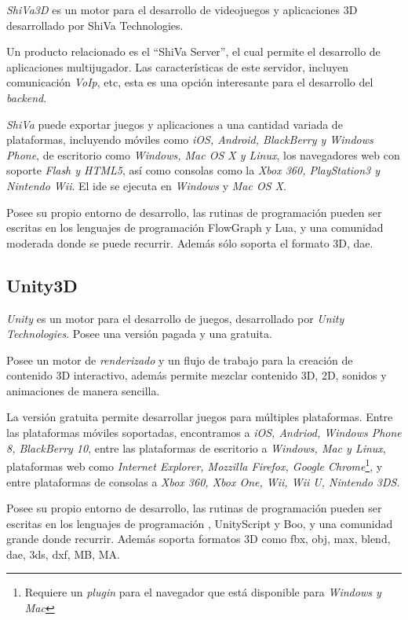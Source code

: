 \textit{ShiVa3D} es un motor para el desarrollo de videojuegos y aplicaciones 
3D desarrollado por ShiVa Technologies\cite{shiva}.

Un producto relacionado es el \enquote{ShiVa Server}, el cual permite el
desarrollo de aplicaciones multijugador. Las características de este servidor,
incluyen comunicación \textit{VoIp}, etc\cite{shiva}, esta es
una opción interesante para el desarrollo del \textit{backend}.

\textit{ShiVa} puede exportar juegos y aplicaciones a una cantidad variada de 
plataformas, incluyendo móviles como \textit{iOS, Android, BlackBerry y Windows
Phone}, de escritorio como \textit{Windows, Mac OS X y Linux}, los
navegadores web con soporte \textit{Flash y HTML5}, así como consolas como la
\textit{Xbox 360, PlayStation3 y Nintendo Wii}. El \Gls{ide} se ejecuta en
\textit{Windows} y \textit{Mac OS X}\cite{shiva}. 

Posee su propio entorno de desarrollo, las rutinas de programación pueden ser 
escritas en los lenguajes de programación FlowGraph y Lua, y una 
comunidad moderada donde se puede recurrir. Además sólo soporta el formato 
3D, dae\cite{shiva}.


\subsection{Unity3D}

\textit{Unity} es un motor para el desarrollo de juegos,
desarrollado por \textit{Unity Technologies}. Posee una versión pagada 
y una gratuita\cite{unity3d}.

Posee un motor de \textit{renderizado} y un flujo de trabajo para la creación 
de contenido 3D interactivo, además permite mezclar contenido 3D, 2D, sonidos 
y animaciones de manera sencilla\cite{unity3d}.

La versión gratuita permite desarrollar juegos para múltiples plataformas. 
Entre las plataformas móviles soportadas, encontramos a \textit{iOS, Andriod, 
Windows Phone 8, BlackBerry 10}, entre las plataformas de escritorio a 
\textit{Windows, Mac y Linux}, plataformas web como \textit{Internet Explorer,
    Mozzilla Firefox, Google Chrome}\footnote{Requiere un \textit{plugin} para
    el navegador que está disponible para \textit{Windows y Mac}}, y entre
plataformas de consolas a \textit{Xbox 360, Xbox One, Wii, Wii U, Nintendo
    3DS}\cite{unity3d}.

Posee su propio entorno de desarrollo, las rutinas de programación pueden ser 
escritas en los lenguajes de programación \cs{}, UnityScript y Boo, y una 
comunidad grande donde recurrir. Además soporta formatos 3D como fbx, obj, max, 
blend, dae, 3ds, dxf, MB, MA\cite{unity3d}.

